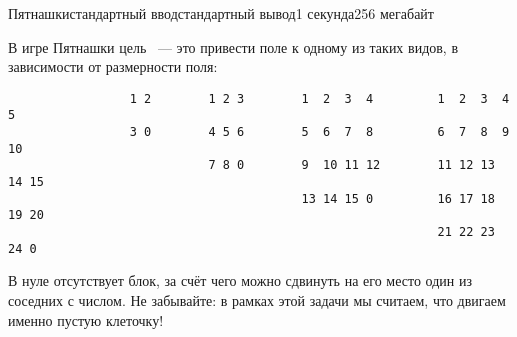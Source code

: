 \begin{problem}{Пятнашки}{стандартный ввод}{стандартный вывод}{1 секунда}{256 мегабайт}
\Examples

\begin{example}
%
%
\end{example}

\Note
В игре Пятнашки цель ~--- это привести поле к одному из таких видов, в зависимости от размерности поля:
\begin{verbatim}
                 1 2        1 2 3        1  2  3  4         1  2  3  4  5
                 3 0        4 5 6        5  6  7  8         6  7  8  9  10
                            7 8 0        9  10 11 12        11 12 13 14 15
                                         13 14 15 0         16 17 18 19 20
                                                            21 22 23 24 0
\end{verbatim}
В нуле отсутствует блок, за счёт чего можно сдвинуть на его место один из соседних с числом. Не забывайте: в рамках этой задачи мы считаем, что двигаем именно пустую клеточку!

\end{problem}

